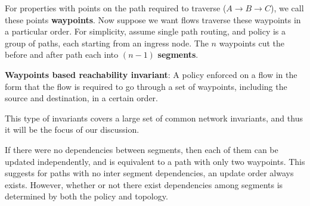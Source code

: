 For properties with 
points on the path required to traverse ($A\rightarrow B\rightarrow C$), we call these points
{\bf waypoints}. Now suppose we want flows traverse these waypoints in a
particular order. %
For simplicity, assume single path routing, and policy is a group of paths,
each starting from an ingress node. 
The $n$ waypoints cut the before and after path each into $(n - 1)$ {\bf segments}. 

\begin{definition} {\bf Waypoints based reachability invariant}: A policy
enforced on a flow in the form that the flow is required to go through a set of
waypoints, including the source and destination, in a certain order.
\end{definition}

This type of invariants covers a large set of common network invariants, and
thus it will be the focus of our discussion. 

If there were no dependencies between segments, then each of them can be updated
independently, and is equivalent to a path with only two waypoints. 
This suggests for paths with no inter segment dependencies, an update order always exists.
However, whether or not there exist
dependencies among segments is determined by both the policy and
topology. 


